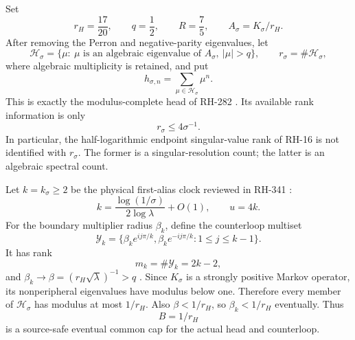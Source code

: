 \documentclass[11pt]{article}
\theoremstyle{remark}
\newcommand{\cH}{\mathcal H}
\newcommand{\cY}{\mathcal Y}
\begin{document}
Set
\begin{equation}\label{eq:hardy-constants}
 r_H=\frac{17}{20},\qquad q=\frac12,\qquad R=\frac75,
 \qquad A_\sigma=K_\sigma/r_H.
\end{equation}
After removing the Perron and negative-parity eigenvalues, let
\begin{equation}\label{eq:actual-head}
 \cH_\sigma
 =\{\mu:\ \mu\text{ is an algebraic eigenvalue of }A_\sigma,
                    \ |\mu|>q\},
 \qquad r_\sigma=\#\cH_\sigma,
\end{equation}
where algebraic multiplicity is retained, and put
\begin{equation}\label{eq:head-moment}
 h_{\sigma,n}=\sum_{\mu\in\cH_\sigma}\mu^n.
\end{equation}
This is exactly the modulus-complete head of RH-282
\citep{WangSpectralTail2026}.  Its available rank information is only
\begin{equation}\label{eq:source-rank-bound}
 r_\sigma\le 4\sigma^{-1}.
\end{equation}
In particular, the half-logarithmic endpoint singular-value rank of RH-16
\citep{WangEndpointRank2026} is not identified with $r_\sigma$.  The former
is a singular-resolution count; the latter is an algebraic spectral count.

Let $k=k_\sigma\ge2$ be the physical first-alias clock reviewed in RH-341
\citep{WangActualFrontier2026}:
\begin{equation}\label{eq:clock}
 k=\frac{\log(1/\sigma)}{2\log\lambda}+O(1),
 \qquad u=4k.
\end{equation}
For the boundary multiplier radius $\beta_k$, define the counterloop multiset
\begin{equation}\label{eq:Y-definition}
 \cY_k=
 \{\beta_k e^{ij\pi/k},\beta_k e^{-ij\pi/k}:1\le j\le k-1\}.
\end{equation}
It has rank
\begin{equation}\label{eq:model-rank}
 m_k=\#\cY_k=2k-2,
\end{equation}
and $\beta_k\to\beta=(r_H\sqrt\lambda)^{-1}>q$
\citep{WangCounterloop2026}.  Since $K_\sigma$ is a strongly positive Markov
operator, its nonperipheral eigenvalues have modulus below one.  Therefore
every member of $\cH_\sigma$ has modulus at most $1/r_H$.  Also
$\beta<1/r_H$, so $\beta_k<1/r_H$ eventually.  Thus
\begin{equation}\label{eq:global-common-cap}
 B=1/r_H
\end{equation}
is a source-safe eventual common cap for the actual head and counterloop.
\end{document}
